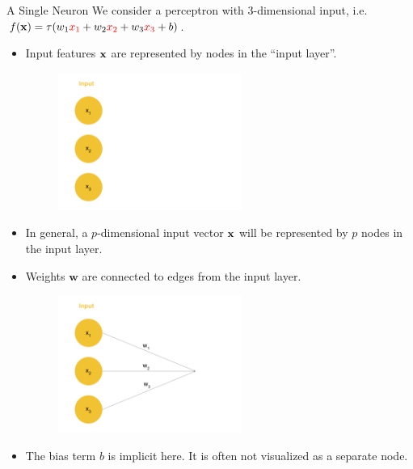 \begin{vbframe} {A Single Neuron}
We consider a %
 perceptron with
$3$-dimensional input, i.e. $f(\mathbf{x}) = \tau(w_1\textcolor{red}{x_1} + w_2\textcolor{red}{x_2} + w_3\textcolor{red}{x_3} + b)$.
\begin{itemize}
\item %
Input features $\mathbf{x}$ are represented by nodes in the \enquote{input layer}.
\begin{figure}
\includegraphics[width=6cm]{figure/neurep_one.png}
\end{figure}
\item In general, a $p$-dimensional input vector $\mathbf{x}$ will be represented by $p$ nodes in the input layer.
\framebreak

\item %
Weights $\mathbf{w}$ are connected to edges from the input layer.
\begin{figure}
\includegraphics[width=6cm]{figure/neurep_two.png}
\end{figure}
\item The bias term $b$ is implicit here. It is often not visualized as a separate node.
\end{itemize}
\framebreak


\end{vbframe}
